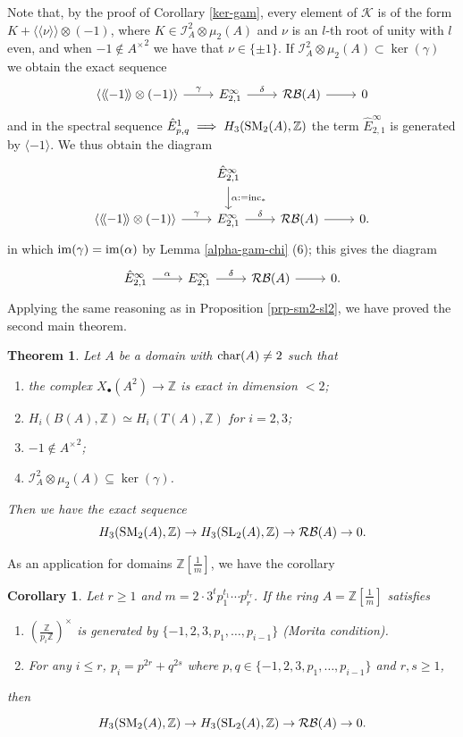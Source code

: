 \documentclass[11pt]{amsart}
\theoremstyle{definition}
\theoremstyle{plain}
\newtheorem{thm}[ntn]{Theorem}
\newtheorem{cor}[ntn]{Corollary}
\numberwithin{equation}{section}
\newcommand{\z}{\mathbb{Z}}
\newcommand{\II}{\mathcal{I}}
\newcommand{\RB}{\mathcal{RB}}
\renewcommand{\aa}{{A^\times}}
\newcommand{\mth}[1]{\left[ \frac{1}{#1} \right]}
\newcommand{\lan}{\langle}
\newcommand{\ran}{\rangle}
\newcommand{\arr}{\rightarrow}
\newcommand{\Lan}{\langle \! \langle}
\newcommand{\Ran}{\rangle \! \rangle}
\newcommand{\SL}{\mathit{{\rm SL}}}
\newcommand{\SM}{\mathit{{\rm SM}}}
\newcommand{\im}{{\rm im}}
\newcommand{\inc}{{\rm inc}}
\renewcommand{\char}{{\rm char}}
\begin{document}
Note that, by the proof of Corollary \ref{ker-gam}, every element of $\mathcal{K}$ is of the form $K+\Lan\nu\Ran\otimes(-1)$, where $K\in\II^2_A\otimes\mu_2(A)$ and $\nu$ is an $l$-th root of unity with $l$ even, and when $-1\notin\aa^2$ we have that $\nu\in\{\pm 1\}$. If $\II^2_A\otimes\mu_2(A)\subset\ker(\gamma)$ we obtain the exact sequence
\[
    \begin{tikzcd}
        \lan\Lan-1\Ran\otimes(-1)\ran\ar[r,"\gamma"] & E^{\infty}_{2,1}\ar[r,"\delta"] & \RB(A)\ar[r] & 0
    \end{tikzcd}
\]
and in the spectral sequence $\hat{E}^1_{p,q}\implies H_3(\SM_2(A),\z)$ the term $\hat{E}^{\infty}_{2,1}$ is generated by $\lan-1\ran$. We thus obtain the diagram
\begin{equation}
\begin{tikzcd}
& \hat{E}^{\infty}_{2,1}\ar[d,"\alpha:=\inc_*"] & &\\
\lan\Lan-1\Ran\otimes (-1)\ran\ar[r,"\gamma"]& E^{\infty}_{2,1} \ar[r,"\delta"] & \RB(A)\ar[r] & 0.
\end{tikzcd}
\end{equation}
in which $\im(\gamma)=\im(\alpha)$ by Lemma \ref{alpha-gam-chi} (6); this gives the diagram
\[
    \begin{tikzcd}
        \hat{E}^{\infty}_{2,1}\ar[r,"\alpha"]& E^{\infty}_{2,1} \ar[r,"\delta"] & \RB(A)\ar[r] & 0.
    \end{tikzcd}
\]
Applying the same reasoning as in Proposition \ref{prp-sm2-sl2}, we have proved the second main theorem.
\begin{thm}
    \label{prp-sm2-sl2-dom}
    Let $A$ be a domain with $\char(A)\neq2$ such that
    \begin{enumerate}
        \item the complex $X_{\bullet}(A^2)\to\z$ is exact in dimension $<2$;
        \item $H_i(B(A),\z)\simeq H_i(T(A),\z)$ for $i=2,3$;
        \item $-1\notin\aa^2$;
        \item $\II^2_{A}\otimes\mu_2(A)\subseteq\ker(\gamma)$.
    \end{enumerate}
    Then we have the exact sequence
    \[
        H_3(\SM_2(A),\z)\arr H_3(\SL_2(A),\z)\arr \RB(A) \arr 0.
    \]
\end{thm}
As an application for domains $\z\mth{m}$, we have the corollary
\begin{cor}\label{sm-sl-zm}
    Let $r\geq 1$ and $m=2\cdot 3^tp_1^{t_1}\cdots p_r^{t_r}$. If the ring $A=\z\mth{m}$ satisfies
    \begin{enumerate}
        \item $\left(\frac{\z}{p_i\z}\right)^\times$ is generated by $\{-1,2,3,p_1,\dots,p_{i-1}\}$ (Morita condition).
        \item For any $i\leq r$, $p_i=p^{2r}+q^{2s}$ where $p,q\in\{-1,2,3,p_1,\dots,p_{i-1}\}$ and $r,s\geq 1$,
    \end{enumerate}
    then
    \[
        \begin{tikzcd}
            H_3(\SM_2(A),\z)\arr H_3(\SL_2(A),\z)\arr \RB(A) \arr 0.
        \end{tikzcd}
    \]
\end{cor}
\end{document}
